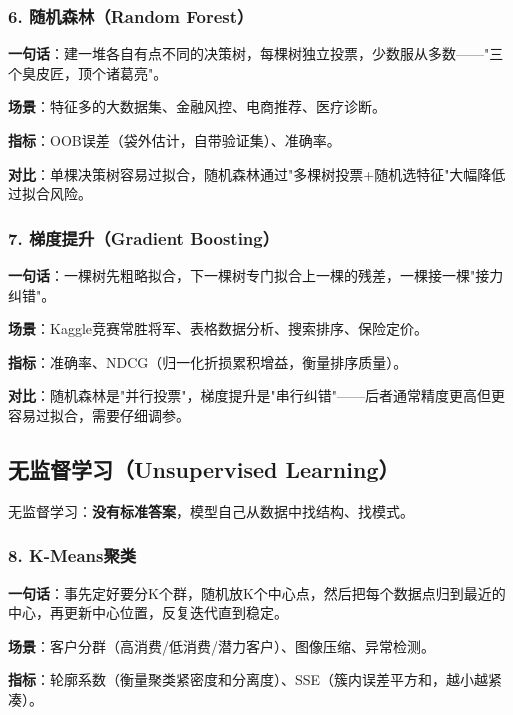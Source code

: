 \documentclass[12pt,a4paper]{ctexart}
\begin{document}
\subsubsection{6. 随机森林（Random Forest）}

\begin{funbox}
\textbf{一句话}：建一堆各自有点不同的决策树，每棵树独立投票，少数服从多数——"三个臭皮匠，顶个诸葛亮"。

\textbf{场景}：特征多的大数据集、金融风控、电商推荐、医疗诊断。

\textbf{指标}：OOB误差（袋外估计，自带验证集）、准确率。

\textbf{对比}：单棵决策树容易过拟合，随机森林通过"多棵树投票+随机选特征"大幅降低过拟合风险。
\end{funbox}

\subsubsection{7. 梯度提升（Gradient Boosting）}

\begin{funbox}
\textbf{一句话}：一棵树先粗略拟合，下一棵树专门拟合上一棵的残差，一棵接一棵"接力纠错"。

\textbf{场景}：Kaggle竞赛常胜将军、表格数据分析、搜索排序、保险定价。

\textbf{指标}：准确率、NDCG（归一化折损累积增益，衡量排序质量）。

\textbf{对比}：随机森林是"并行投票"，梯度提升是"串行纠错"——后者通常精度更高但更容易过拟合，需要仔细调参。
\end{funbox}

\subsection{无监督学习（Unsupervised Learning）}

无监督学习：\textbf{没有标准答案}，模型自己从数据中找结构、找模式。

\subsubsection{8. K-Means聚类}

\begin{funbox}[K-Means]
\textbf{一句话}：事先定好要分K个群，随机放K个中心点，然后把每个数据点归到最近的中心，再更新中心位置，反复迭代直到稳定。

\textbf{场景}：客户分群（高消费/低消费/潜力客户）、图像压缩、异常检测。

\textbf{指标}：轮廓系数（衡量聚类紧密度和分离度）、SSE（簇内误差平方和，越小越紧凑）。
\end{funbox}
\end{document}
